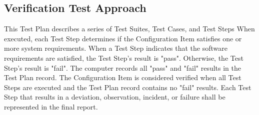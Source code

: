 \subsection{Verification Test Approach}
This Test Plan describes a series of Test Suites, Test Cases, and Test Steps
When executed, each Test Step determines if the Configuration Item satisfies one
or more system requirements.  When a Test Step indicates that the software
requirements are satisfied, the Test Step's result is "pass".  Otherwise, the
Test Step's result is "fail".  The computer records all "pass" and "fail"
results in the Test Plan record.  The Configuration Item is considered
verified when all Test Steps are executed and the Test Plan record contains
no "fail" results.  Each Test Step that results in a deviation, observation,
incident, or failure shall be represented in the final report.